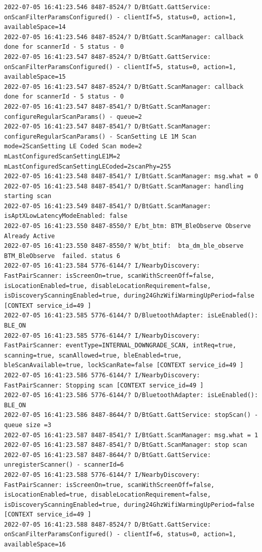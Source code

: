 \documentclass[a4paper,12pt]{book}
\begin{document}
\begin{lstlisting}
2022-07-05 16:41:23.546 8487-8524/? D/BtGatt.GattService: onScanFilterParamsConfigured() - clientIf=5, status=0, action=1, availableSpace=14
2022-07-05 16:41:23.546 8487-8524/? D/BtGatt.ScanManager: callback done for scannerId - 5 status - 0
2022-07-05 16:41:23.547 8487-8524/? D/BtGatt.GattService: onScanFilterParamsConfigured() - clientIf=5, status=0, action=1, availableSpace=15
2022-07-05 16:41:23.547 8487-8524/? D/BtGatt.ScanManager: callback done for scannerId - 5 status - 0
2022-07-05 16:41:23.547 8487-8541/? D/BtGatt.ScanManager: configureRegularScanParams() - queue=2
2022-07-05 16:41:23.547 8487-8541/? D/BtGatt.ScanManager: configureRegularScanParams() - ScanSetting LE 1M Scan mode=2ScanSetting LE Coded Scan mode=2 mLastConfiguredScanSettingLE1M=2 mLastConfiguredScanSettingLECoded=2scanPhy=255
2022-07-05 16:41:23.548 8487-8541/? I/BtGatt.ScanManager: msg.what = 0
2022-07-05 16:41:23.548 8487-8541/? D/BtGatt.ScanManager: handling starting scan
2022-07-05 16:41:23.549 8487-8541/? D/BtGatt.ScanManager: isAptXLowLatencyModeEnabled: false
2022-07-05 16:41:23.550 8487-8550/? E/bt_btm: BTM_BleObserve Observe Already Active
2022-07-05 16:41:23.550 8487-8550/? W/bt_btif:  bta_dm_ble_observe BTM_BleObserve  failed. status 6
2022-07-05 16:41:23.584 5776-6144/? I/NearbyDiscovery: FastPairScanner: isScreenOn=true, scanWithScreenOff=false, isLocationEnabled=true, disableLocationRequirement=false, isDiscoveryScanningEnabled=true, during24GhzWifiWarmingUpPeriod=false [CONTEXT service_id=49 ]
2022-07-05 16:41:23.585 5776-6144/? D/BluetoothAdapter: isLeEnabled(): BLE_ON
2022-07-05 16:41:23.585 5776-6144/? I/NearbyDiscovery: FastPairScanner: eventType=INTERNAL_DOWNGRADE_SCAN, intReq=true, scanning=true, scanAllowed=true, bleEnabled=true, bleScanAvailable=true, lockScanRate=false [CONTEXT service_id=49 ]
2022-07-05 16:41:23.586 5776-6144/? I/NearbyDiscovery: FastPairScanner: Stopping scan [CONTEXT service_id=49 ]
2022-07-05 16:41:23.586 5776-6144/? D/BluetoothAdapter: isLeEnabled(): BLE_ON
2022-07-05 16:41:23.586 8487-8644/? D/BtGatt.GattService: stopScan() - queue size =3
2022-07-05 16:41:23.587 8487-8541/? I/BtGatt.ScanManager: msg.what = 1
2022-07-05 16:41:23.587 8487-8541/? D/BtGatt.ScanManager: stop scan
2022-07-05 16:41:23.587 8487-8644/? D/BtGatt.GattService: unregisterScanner() - scannerId=6
2022-07-05 16:41:23.588 5776-6144/? I/NearbyDiscovery: FastPairScanner: isScreenOn=true, scanWithScreenOff=false, isLocationEnabled=true, disableLocationRequirement=false, isDiscoveryScanningEnabled=true, during24GhzWifiWarmingUpPeriod=false [CONTEXT service_id=49 ]
2022-07-05 16:41:23.588 8487-8524/? D/BtGatt.GattService: onScanFilterParamsConfigured() - clientIf=6, status=0, action=1, availableSpace=16

\end{lstlisting}
\end{document}
